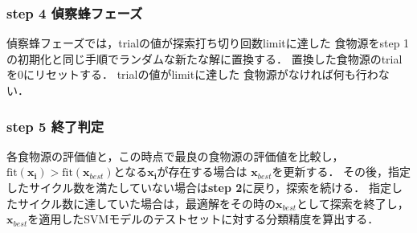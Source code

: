 \subsubsection*{step 4 偵察蜂フェーズ}
偵察蜂フェーズでは，trialの値が探索打ち切り回数limitに達した
食物源をstep 1 の初期化と同じ手順でランダムな新たな解に置換する． 
置換した食物源のtrialを0にリセットする．
trialの値がlimitに達した
食物源がなければ何も行わない．
\subsubsection*{step 5 終了判定}
各食物源の評価値と，この時点で最良の食物源の評価値を比較し，
$\mathrm{fit}(\boldsymbol{x_{i}}) > \mathrm{fit}(\boldsymbol{x}_{best})$となる$\boldsymbol{x_{i}}$が存在する場合は
$\boldsymbol{x}_{best}$を更新する．
その後，指定したサイクル数を満たしていない場合は\textbf{step 2}に戻り，探索を続ける．
指定したサイクル数に達していた場合は，最適解をその時の$\boldsymbol{x}_{best}$として探索を終了し，
$\boldsymbol{x}_{best}$を適用したSVMモデルのテストセットに対する分類精度を算出する．